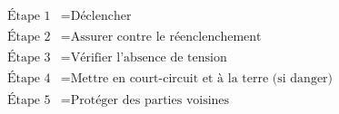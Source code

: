 \documentclass[a4paper,11pt,answers,addpoints]{exam}
\begin{document}
\begin{questions}
\begin{solution}
	\begin{align*}
		\text{Étape 1} &= \text{Déclencher} \\[6pt]
		\text{Étape 2} &= \text{Assurer contre le réenclenchement} \\[6pt]
		\text{Étape 3} &= \text{Vérifier l'absence de tension} \\[6pt]
		\text{Étape 4} &= \text{Mettre en court-circuit et à la terre (si danger)} \\[6pt]
		\text{Étape 5} &= \text{Protéger des parties voisines}
	\end{align*}
\end{solution}
\end{questions}
\end{document}
